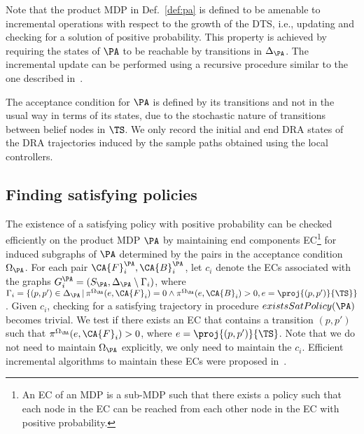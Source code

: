 \begin{remark}
Note that the product MDP in Def.~\ref{def:pa} is defined to be amenable to
incremental operations with respect to the growth of the DTS, i.e., updating and
checking for a solution of positive probability.
This property is achieved by requiring the states of $\PA$ to be reachable
by transitions in $\Delta_\PA$.
The incremental update can be performed using a recursive procedure
similar to the one described in~\cite{VaBe-IROS-2013}.
\end{remark}
\begin{remark}
The acceptance condition for $\PA$ is defined by its transitions and not in the usual way in terms
of its states, %
due to the stochastic nature of transitions between belief
nodes in $\TS$. We only record the initial and end DRA states of the
DRA trajectories induced by the sample paths obtained using the local
controllers.
\end{remark}



\subsection{Finding satisfying policies}%

The existence of a satisfying policy with positive probability can be checked efficiently
on the product MDP $\PA$ by maintaining end components EC\footnote{An
EC of an MDP is a sub-MDP  such that there exists a policy such that each
node in the EC can be reached from each other node in the EC with positive
probability.}
for induced subgraphs of $\PA$ determined by the pairs in the acceptance
condition $\Omega_\PA$.
For each pair $\CA{F}^\PA_i, \CA{B}^\PA_i$, let $c_i$ denote the
ECs associated with the graphs $G^\PA_i = (S_\PA,\Delta_\PA \setminus \Gamma_i)$, where
$\Gamma_i =  \{ (p, p') \in \Delta_\PA \,|\, \pi^{\Omega_\RA}(e, \CA{F}_i) = 0 \wedge \pi^{\Omega_\RA}(e, \CA{B}_i) > 0, e=\proj{(p, p')}{\TS} \}$.
Given $c_i$, checking for a satisfying trajectory in procedure $existsSatPolicy(\PA)$
becomes trivial.
We test if there exists an EC %
that contains a transition $(p, p')$ such that
$\pi^{\Omega_\RA}(e, \CA{F}_i) > 0$, where $e=\proj{(p, p')}{\TS}$.
Note that we do not need to maintain $\Omega_\PA$ explicitly, we only
need to maintain the  $c_i$.
Efficient incremental algorithms to maintain these ECs were proposed
in~\cite{Haeupler2012}. %

